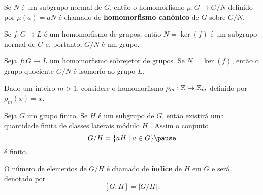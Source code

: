 \documentclass{beamer}
\begin{document}
    \begin{frame}
        \begin{definicao}
            Se $N$ é um subgrupo normal de $G$, \pause então o homomorfismo $\mu : G \to G/N$ \pause definido por $\mu(a) = aN$ \pause é chamado de \textbf{homomorfismo canônico} \pause de $G$ sobre $G/N$.
        \end{definicao}
    \end{frame}

    \begin{frame}
        \begin{lema}
            Se $f : G \to L$ é um homomorfismo de grupos, \pause então $N = \ker(f)$ \pause é um subgrupo normal de $G$ \pause e, portanto, $G/N$ é um grupo.
        \end{lema}
    \end{frame}

    \begin{frame}
        \begin{teorema}
            Seja $f : G \to L$ um homomorfismo sobrejetor \pause de grupos. \pause Se $N = \ker(f)$, \pause então o grupo quociente $G/N$ é isomorfo ao grupo $L$.
        \end{teorema}
    \end{frame}

    \begin{frame}
        \begin{exemplo}
            Dado um inteiro $m > 1$, \pause considere o homomorfismo $\rho_m : \mathbb{Z} \to \mathbb{Z}_m$ \pause definido por $\rho_m(x) = \overline{x}$.
        \end{exemplo}
    \end{frame}

    \begin{frame}
        Seja $G$ um grupo finito. \pause Se $H$ é um subgrupo de $G$, \pause então existirá uma quantidade finita de classes laterais m\'odulo $H$ \pause.
        Assim o conjunto
        \[
            G/H = \{aH \mid a \in G\} \pause
        \]
        é finito. \pause

        O número de elementos de $G/H$ \pause é chamado de \textbf{índice} \pause de $H$ em $G$ \pause e será denotado por
        \[
            [G : H] = |G/H|.
        \]
    \end{frame}
\end{document}
